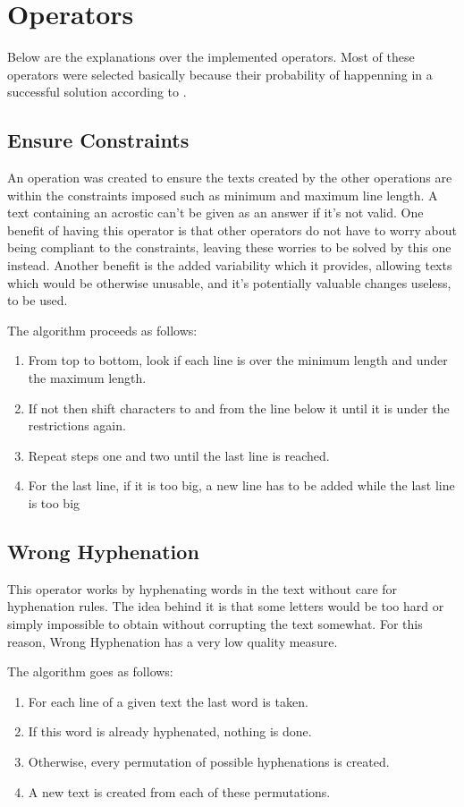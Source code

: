 \documentclass[11pt]{reportAlternative}
\begin{document}
\section{Operators}
Below are the explanations over the implemented operators. Most of these operators were selected basically because their probability of happenning in a successful solution according to \cite[p.~2025]{Stein}.

\subsection{Ensure Constraints}
An operation was created to ensure the texts created by the other operations are within the constraints imposed such as minimum and maximum line length. A text containing an acrostic can't be given as an answer if it's not valid. One benefit of having this operator is that other operators do not have to worry about being compliant to the constraints, leaving these worries to be solved by this one instead. Another benefit is the added variability which it provides, allowing texts which would be otherwise unusable, and it's potentially valuable changes useless, to be used.

The algorithm proceeds as follows:
\begin{enumerate}
\item From top to bottom, look if each line is over the minimum length and under the maximum length.
\item If not then shift characters to and from the line below it until it is under the restrictions again.
\item Repeat steps one and two until the last line is reached.
\item For the last line, if it is too big, a new line has to be added while the last line is too big
\end{enumerate}

\subsection{Wrong Hyphenation}
This operator works by hyphenating words in the text without care for hyphenation rules. The idea behind it is that some letters would be too hard or simply impossible to obtain without corrupting the text somewhat.
For this reason, Wrong Hyphenation has a very low quality measure.

The algorithm goes as follows:
\begin{enumerate}
\item For each line of a given text the last word is taken.
\item If this word is already hyphenated, nothing is done.
\item Otherwise, every permutation of possible hyphenations is created.
\item A new text is created from each of these permutations.
\end{enumerate}
\end{document}
